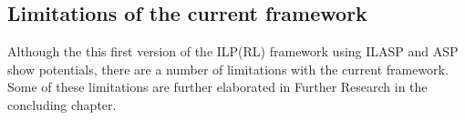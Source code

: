 
\subsection{Limitations of the current framework}
\label{subsec:limitations}
Although the this first version of the ILP(RL) framework using ILASP and ASP show potentials, there are a number of limitations with the current framework.
Some of these limitations are further elaborated in Further Research in the concluding chapter.

